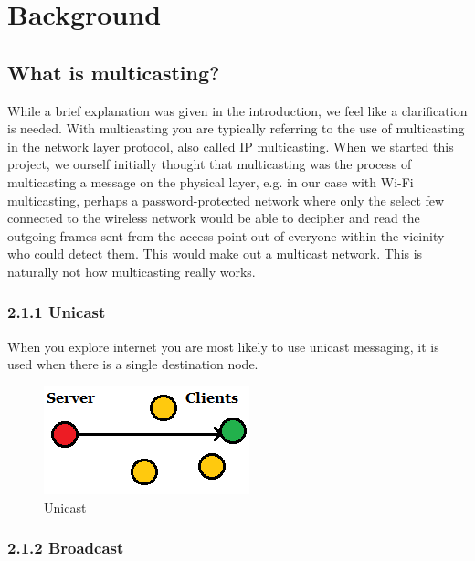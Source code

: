 \documentclass[9pt,a4paper]{acmproc}
\begin{document}
\newpage

\section{Background}

\subsection{What is multicasting?}

While a brief explanation was given in the introduction, we feel like a clarification is needed. With multicasting you are typically referring to the use of multicasting in the network layer protocol, also called IP multicasting. When we started this project, we ourself initially thought that multicasting was the process of multicasting a message on the physical layer, e.g. in our case with Wi-Fi multicasting, perhaps a password-protected network where only the select few connected to the wireless network would be able to decipher and read the outgoing frames sent from the access point out of everyone within the vicinity who could detect them. This would make out a multicast network. This is naturally not how multicasting really works.
\subsubsection*{2.1.1 Unicast}

When you explore internet you are most likely to use unicast messaging, it is used when there is a single destination node. 

\begin{figure}[h!]
  \includegraphics[width=\linewidth]{unicast.png}
  \caption{Unicast}
  \label{fig:Unicast}
\end{figure}

\subsubsection*{2.1.2 Broadcast}
\end{document}
